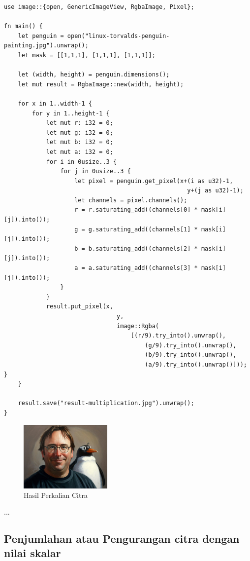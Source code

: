 \documentclass[a4paper,12pt,openany]{book}
\begin{document}
\begin{lstlisting}
use image::{open, GenericImageView, RgbaImage, Pixel};

fn main() {
    let penguin = open("linux-torvalds-penguin-painting.jpg").unwrap();
    let mask = [[1,1,1], [1,1,1], [1,1,1]];

    let (width, height) = penguin.dimensions();
    let mut result = RgbaImage::new(width, height);

    for x in 1..width-1 {
        for y in 1..height-1 {
            let mut r: i32 = 0;
            let mut g: i32 = 0;
            let mut b: i32 = 0;
            let mut a: i32 = 0;
            for i in 0usize..3 {
                for j in 0usize..3 {
                    let pixel = penguin.get_pixel(x+(i as u32)-1,
                                                    y+(j as u32)-1);
                    let channels = pixel.channels();
                    r = r.saturating_add((channels[0] * mask[i][j]).into());
                    g = g.saturating_add((channels[1] * mask[i][j]).into());
                    b = b.saturating_add((channels[2] * mask[i][j]).into());
                    a = a.saturating_add((channels[3] * mask[i][j]).into());
                }
            }
            result.put_pixel(x,
                                y,
                                image::Rgba(
                                    [(r/9).try_into().unwrap(),
                                        (g/9).try_into().unwrap(),
                                        (b/9).try_into().unwrap(),
                                        (a/9).try_into().unwrap()]));        }
    }

    result.save("result-multiplication.jpg").unwrap();
}
\end{lstlisting}


\begin{figure}[H]
    \centering
    \includegraphics[width=0.4\textwidth]{./image/arithmetic/result-multiplication.jpg}
    \caption{Hasil Perkalian Citra}
\end{figure}
...

\subsection{Penjumlahan atau Pengurangan citra dengan nilai skalar}
\end{document}
